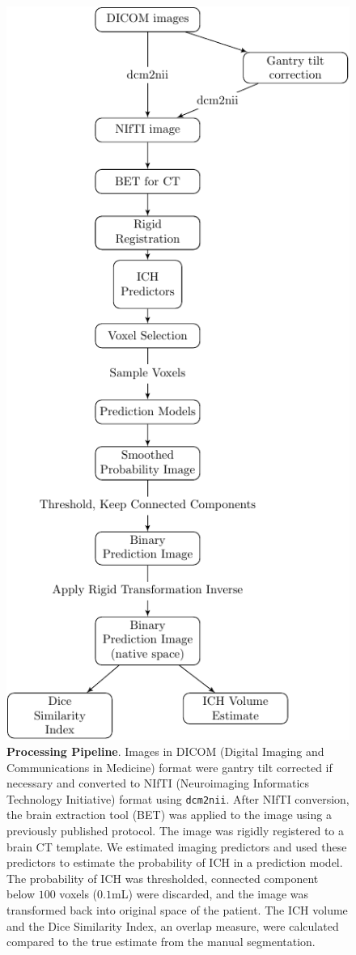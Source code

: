 

\begin{figure}
\centering
\includegraphics[width=0.5\linewidth]{Imaging_Pipeline_Flowchart_with_Rigid.pdf}
\caption{{\bf Processing Pipeline}.  Images in DICOM (Digital Imaging and Communications in Medicine) format were gantry tilt corrected if necessary and converted to NIfTI (Neuroimaging Informatics Technology Initiative) format using \texttt{dcm2nii}.  After NIfTI conversion, the brain extraction tool (BET) was applied to the image using a previously published protocol.  The image was rigidly registered to a brain CT template.  We estimated imaging predictors and used these predictors to estimate the probability of ICH in a prediction model.  The probability of ICH was thresholded, connected component below $100$ voxels ($0.1$mL) were discarded, and the image was transformed back into original space of the patient.  The ICH volume and the Dice Similarity Index, an overlap measure, were calculated compared to the true estimate from the manual segmentation.  }
\label{fig:framework}
\end{figure}

